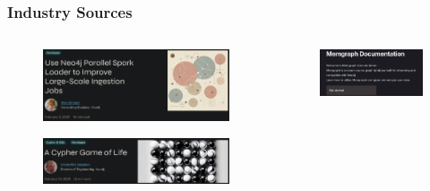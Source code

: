 \documentclass[
	aspectratio=169,
	compress,
]{beamer}
\newcommand{\navframetitle}[1]{\frametitle{#1\hfill{\footnotesize\lastsection{}}}}
\begin{document}
\begin{frame}
	\navframetitle{Industry Sources}
    \vspace{-1em}
	\begin{columns}[T]
		\begin{column}{0.3\textwidth}
            \begin{figure}
                \caption{\cite{neo4jSparkLoader}}
                \begin{center}
                    \includegraphics[height=0.2\textheight]{./figures/neo4jSpark.png}
                \end{center}
            \end{figure}
            \begin{figure}
                \caption{\cite{neo4jCypherGOL}}
                \begin{center}
                    \includegraphics[width=\textwidth]{./figures/neo4jCypherGameOfLife.png}
                \end{center}
            \end{figure}
        \end{column}
        \pause
		\begin{column}{0.3\textwidth}
            \begin{figure}
                \caption{\cite{MemgraphDocs}}
                \begin{center}
                    \includegraphics[height=0.2\textheight]{./figures/memgraphDocs.png}

\end{center}
\end{figure}
\end{column}
\end{columns}
\end{frame}
\end{document}
